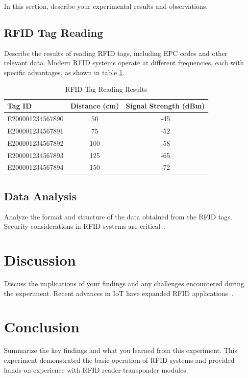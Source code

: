 \documentclass[acmsmall,nonacm]{acmart}
\begin{document}
In this section, describe your experimental results and observations.

\subsection{RFID Tag Reading}

Describe the results of reading RFID tags, including EPC codes and other relevant data. Modern RFID systems operate at different frequencies, each with specific advantages, as shown in table \ref{tab:rfid_results}.

\begin{table}[h]
  \centering
  \caption{RFID Tag Reading Results}
  \label{tab:rfid_results}
  \begin{tabular}{lcc}
    \toprule
    \textbf{Tag ID} & \textbf{Distance (cm)} & \textbf{Signal Strength (dBm)} \\
    \midrule
    E200001234567890 & 50 & -45 \\
    E200001234567891 & 75 & -52 \\
    E200001234567892 & 100 & -58 \\
    E200001234567893 & 125 & -65 \\
    E200001234567894 & 150 & -72 \\
    \bottomrule
  \end{tabular}
\end{table}

\subsection{Data Analysis}

Analyze the format and structure of the data obtained from the RFID tags. Security considerations in RFID systems are critical~\cite{juels2006rfid}.

\section{Discussion}

Discuss the implications of your findings and any challenges encountered during the experiment. Recent advances in IoT have expanded RFID applications~\cite{atzori2010internet}.

\section{Conclusion}

Summarize the key findings and what you learned from this experiment. This experiment demonstrated the basic operation of RFID systems and provided hands-on experience with RFID reader-transponder modules.

 

\end{document}
